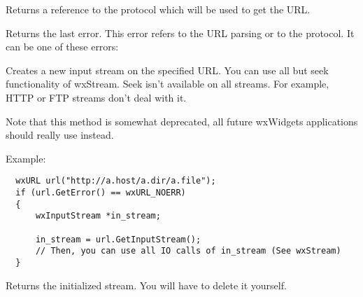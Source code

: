 
Returns a reference to the protocol which will be used to get the URL.

%
%
\label{wxurlgeterror}


Returns the last error. This error refers to the URL parsing or to the protocol.
It can be one of these errors:

\twocolwidtha{7cm}
\begin{twocollist}\itemsep=0pt%
\end{twocollist}%

%
%
\label{wxurlgetinputstream}


Creates a new input stream on the specified URL. You can use all but seek
functionality of wxStream. Seek isn't available on all streams. For example,
HTTP or FTP streams don't deal with it.

Note that this method is somewhat deprecated, all future wxWidgets applications
should really use  instead.

Example:

\begin{verbatim}
  wxURL url("http://a.host/a.dir/a.file");
  if (url.GetError() == wxURL_NOERR)
  {
      wxInputStream *in_stream;

      in_stream = url.GetInputStream();
      // Then, you can use all IO calls of in_stream (See wxStream)
  }
\end{verbatim}


Returns the initialized stream. You will have to delete it yourself.




